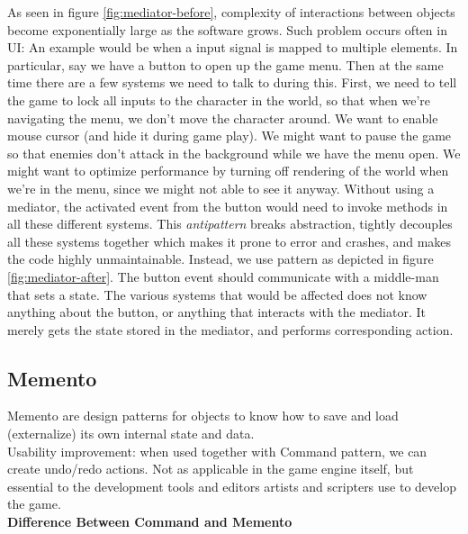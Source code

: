 \documentclass[10pt,letterpaper]{article}
\newcommand{\bs}{\bigskip}
\begin{document}
\begin{multicols}{2}
As seen in figure \ref{fig:mediator-before}, complexity of interactions between objects become exponentially large as the software grows.
\bs
Such problem occurs often in UI: An example would be when a input signal is mapped to multiple elements. In particular, say we have a button to open up the game menu. Then at the same time there are a few systems we need to talk to during this. First, we need to tell the game to lock all inputs to the character in the world, so that when we're navigating the menu, we don't move the character around. We want to enable mouse cursor (and hide it during game play). We might want to pause the game so that enemies don't attack in the background while we have the menu open. We might want to optimize performance by turning off rendering of the world when we're in the menu, since we might not able to see it anyway.
\bs
Without using a mediator, the activated event from the button would need to invoke methods in all these different systems. This \textit{antipattern} breaks abstraction, tightly decouples all these systems together which makes it prone to error and crashes, and makes the code highly unmaintainable.
\bs
Instead, we use pattern as depicted in figure \ref{fig:mediator-after}. The button event should communicate with a middle-man that sets a state. The various systems that would be affected does not know anything about the button, or anything that interacts with the mediator. It merely gets the state stored in the mediator, and performs corresponding action.
\bs


\subsection{Memento}

Memento are design patterns for objects to know how to save and load (externalize) its own internal state and data.\bs
\\
Usability improvement: when used together with Command pattern, we can create undo/redo actions. Not as applicable in the game engine itself, but essential to the development tools and editors artists and scripters use to develop the game.\bs
\\

\textbf{Difference Between Command and Memento}\bs
\\


\end{multicols}
\end{document}

